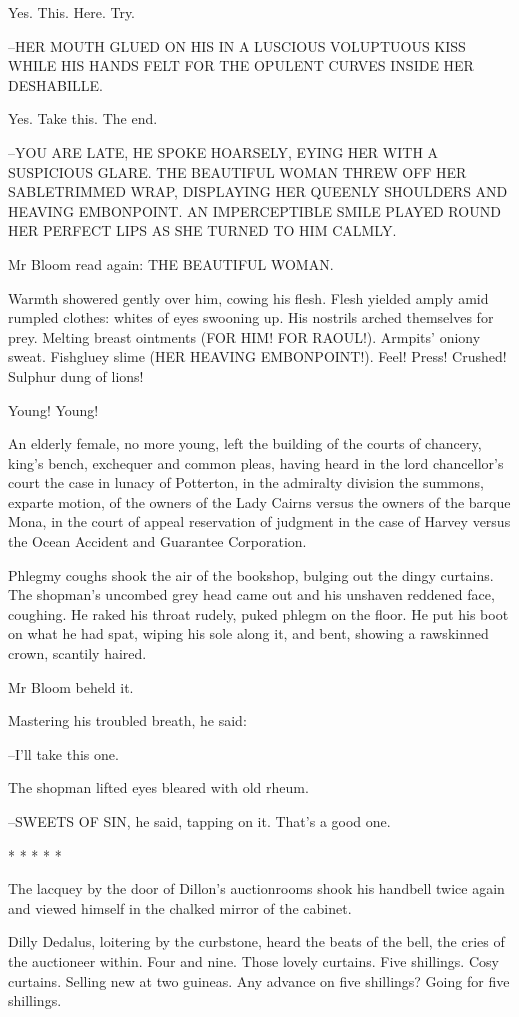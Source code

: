 Yes. This. Here. Try.

--HER MOUTH GLUED ON HIS IN A LUSCIOUS VOLUPTUOUS KISS WHILE HIS HANDS
FELT FOR THE OPULENT CURVES INSIDE HER DESHABILLE.

Yes. Take this. The end.

--YOU ARE LATE, HE SPOKE HOARSELY, EYING HER WITH A SUSPICIOUS GLARE.
THE BEAUTIFUL WOMAN THREW OFF HER SABLETRIMMED WRAP, DISPLAYING HER
QUEENLY SHOULDERS AND HEAVING EMBONPOINT. AN IMPERCEPTIBLE SMILE PLAYED
ROUND HER PERFECT LIPS AS SHE TURNED TO HIM CALMLY.

Mr Bloom read again: THE BEAUTIFUL WOMAN.

Warmth showered gently over him, cowing his flesh. Flesh yielded
amply amid rumpled clothes: whites of eyes swooning up. His nostrils
arched themselves for prey. Melting breast ointments (FOR HIM! FOR
RAOUL!). Armpits' oniony sweat. Fishgluey slime (HER HEAVING EMBONPOINT!).
Feel! Press! Crushed! Sulphur dung of lions!

Young! Young!

An elderly female, no more young, left the building of the courts of
chancery, king's bench, exchequer and common pleas, having heard in the
lord chancellor's court the case in lunacy of Potterton, in the admiralty
division the summons, exparte motion, of the owners of the Lady Cairns
versus the owners of the barque Mona, in the court of appeal reservation
of judgment in the case of Harvey versus the Ocean Accident and Guarantee
Corporation.

Phlegmy coughs shook the air of the bookshop, bulging out the dingy
curtains. The shopman's uncombed grey head came out and his unshaven
reddened face, coughing. He raked his throat rudely, puked phlegm on the
floor. He put his boot on what he had spat, wiping his sole along it, and
bent, showing a rawskinned crown, scantily haired.

Mr Bloom beheld it.

Mastering his troubled breath, he said:

--I'll take this one.

The shopman lifted eyes bleared with old rheum.

--SWEETS OF SIN, he said, tapping on it. That's a good one.


    * * * * *


The lacquey by the door of Dillon's auctionrooms shook his handbell
twice again and viewed himself in the chalked mirror of the cabinet.

Dilly Dedalus, loitering by the curbstone, heard the beats of the bell,
the cries of the auctioneer within. Four and nine. Those lovely curtains.
Five shillings. Cosy curtains. Selling new at two guineas. Any advance on
five shillings? Going for five shillings.

